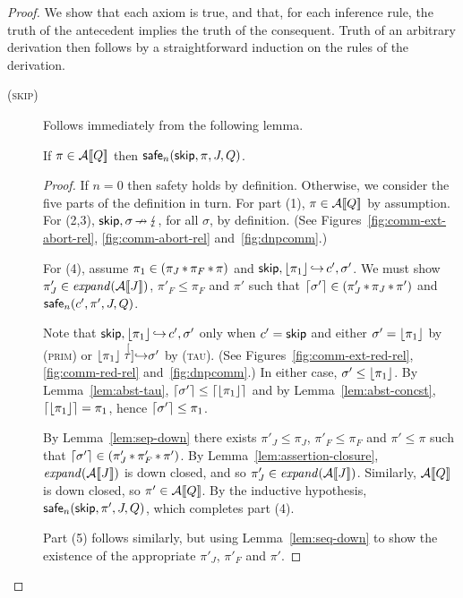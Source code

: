 \documentclass[11pt]{report}
\begin{document}
\begin{proof}
	We show that each axiom is true, and that, for each inference rule, the truth of the antecedent implies the truth of the consequent. Truth of an arbitrary derivation then follows by a straightforward induction on the rules of the derivation. 
	
	\begin{description}
		\item[(\textsc{skip})] Follows immediately from the following lemma. 
		
		\begin{lemma}\label{lem:skip-sound}
			If $\pi \in \mathcal{A}[\![Q]\!]$ then $\mathsf{safe}_{n}(\operatorname{\mathsf{skip}},\pi,J,Q)$.
		\end{lemma}
		
		\begin{proof}
			If $n = 0$ then safety holds by definition. Otherwise, we consider the five parts of the definition in turn. For part (1), $\pi \in \mathcal{A}[\![Q]\!]$ by assumption. For (2,3), $\operatorname{\mathsf{skip}},\sigma \operatorname{\nrightarrow} \lightning$, for all $\sigma$, by definition. (See Figures~\ref{fig:comm-ext-abort-rel}, \ref{fig:comm-abort-rel} and~\ref{fig:dnpcomm}.) 
			
			For (4), assume $\pi_1 \in (\pi_J \operatorname{\ast} \pi_F \operatorname{\ast} \pi)$ and $\operatorname{\mathsf{skip}}, \left\lfloor\pi_1\right\rfloor \operatorname{\hookrightarrow} c',\sigma'$. We must show $\pi'_J \in \mathit{expand}(\mathcal{A}[\![J]\!])$, $\pi'_F \leq \pi_F$ and $\pi'$ such that $\left\lceil\sigma'\right\rceil \in (\pi'_J \operatorname{\ast} \pi_J \operatorname{\ast} \pi')$ and $\mathsf{safe}_{n}(c',\pi',J,Q)$. 
			
			Note that $\operatorname{\mathsf{skip}},\left\lfloor\pi_1\right\rfloor \operatorname{\hookrightarrow} c',\sigma'$ only when $c' = \operatorname{\mathsf{skip}}$ and either $\sigma' = \left\lfloor\pi_1\right\rfloor$ by (\textsc{prim}) or $\left\lfloor\pi_1\right\rfloor \stackrel[\tau]{}{\operatorname{\hookrightarrow}} \sigma'$ by (\textsc{tau}). (See Figures~\ref{fig:comm-ext-red-rel}, \ref{fig:comm-red-rel} and~\ref{fig:dnpcomm}.) In either case, $\sigma' \leq \left\lfloor\pi_1\right\rfloor$. By Lemma~\ref{lem:abst-tau}, $\left\lceil\sigma'\right\rceil \leq \left\lceil\left\lfloor\pi_1\right\rfloor\right\rceil$ and by Lemma~\ref{lem:abst-concst}, $\left\lceil\left\lfloor\pi_1\right\rfloor\right\rceil = \pi_1$, hence $\left\lceil\sigma'\right\rceil \leq \pi_1$. 
			
			By Lemma~\ref{lem:sep-down} there exists $\pi'_J \leq \pi_J$, $\pi'_F \leq \pi_F$ and $\pi' \leq \pi$ such that $\left\lceil\sigma'\right\rceil \in (\pi'_J \operatorname{\ast} \pi'_F \operatorname{\ast} \pi')$. By Lemma~\ref{lem:assertion-closure}, $\mathit{expand}(\mathcal{A}[\![J]\!])$ is down closed, and so $\pi'_J \in \mathit{expand}(\mathcal{A}[\![J]\!])$. Similarly, $\mathcal{A}[\![Q]\!]$ is down closed, so $\pi' \in \mathcal{A}[\![Q]\!]$. By the inductive hypothesis, $\mathsf{safe}_{n}(\operatorname{\mathsf{skip}}, \pi', J, Q)$, which completes part (4). 
			
			Part (5) follows similarly, but using Lemma~\ref{lem:seq-down} to show the existence of the appropriate $\pi'_J$, $\pi'_F$ and $\pi'$. 
			

\end{proof}
\end{description}
\end{proof}
\end{document}
